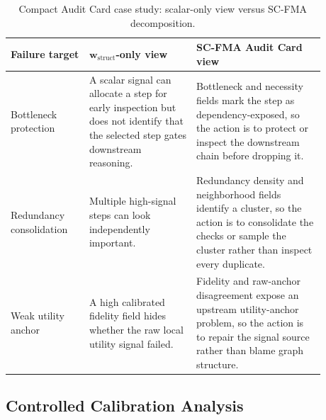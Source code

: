 \documentclass[a4paper,fleqn]{cas-sc}
\newcommand{\wstruct}{\ensuremath{\mathbf{w}_{\mathrm{struct}}}}
\begin{document}
\begin{table}[H]
\caption{Compact Audit Card case study: scalar-only view versus SC-FMA decomposition.}
\label{tab:compact-audit-card-case}
\centering
\small
\renewcommand{\arraystretch}{1.08}
\begin{tabular}{Z{0.22\linewidth}Z{0.30\linewidth}Z{0.36\linewidth}}
\toprule
\textbf{Failure target} & \textbf{\wstruct{}-only view} & \textbf{SC-FMA Audit Card view} \\
\midrule
Bottleneck protection & A scalar signal can allocate a step for early inspection but does not identify that the selected step gates downstream reasoning. & Bottleneck and necessity fields mark the step as dependency-exposed, so the action is to protect or inspect the downstream chain before dropping it. \\
Redundancy consolidation & Multiple high-signal steps can look independently important. & Redundancy density and neighborhood fields identify a cluster, so the action is to consolidate the checks or sample the cluster rather than inspect every duplicate. \\
Weak utility anchor & A high calibrated fidelity field hides whether the raw local utility signal failed. & Fidelity and raw-anchor disagreement expose an upstream utility-anchor problem, so the action is to repair the signal source rather than blame graph structure. \\
\bottomrule
\end{tabular}
\end{table}

\subsection{Controlled Calibration Analysis}
\label{sec:controlled-calibration}
\end{document}

